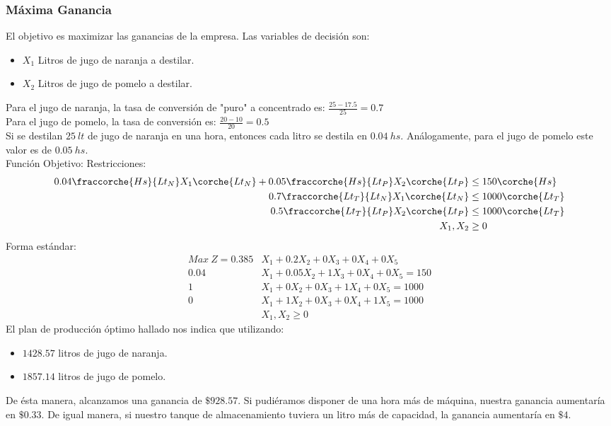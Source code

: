 \begin{homeworkProblem}[-1][Citrus]
\subsubsection{Máxima Ganancia}
El objetivo es maximizar las ganancias de la empresa.
Las variables de decisión son:
\begin{itemize}
  \item $X_1$ Litros de jugo de naranja a destilar.
  \item $X_2$ Litros de jugo de pomelo a destilar.
\end{itemize}
Para el jugo de naranja, la tasa de conversión de "puro" a concentrado es: $\frac{25-17.5}{25} = 0.7$ \\
Para el jugo de pomelo, la tasa de conversión es: $ \frac{20-10}{20} = 0.5$ \\
Si se destilan $25\ lt$ de jugo de naranja en una hora, entonces cada litro se destila en $0.04\ hs$. Análogamente, para el jugo de pomelo este valor es de $0.05\ hs$. \\
Función Objetivo: 
Restricciones:
\begin{align*}
  0.04\fraccorche{Hs}{Lt_N}X_1\corche{Lt_N} + 0.05\fraccorche{Hs}{Lt_P}X_2\corche{Lt_P} &\le 150\corche{Hs} \\
  0.7\fraccorche{Lt_T}{Lt_N}X_1\corche{Lt_N}                                            &\le 1000\corche{Lt_T} \\
  0.5\fraccorche{Lt_T}{Lt_P}X_2\corche{Lt_P}                                            &\le 1000\corche{Lt_T} \\
  X_1,X_2 &\ge 0 
\end{align*}
Forma estándar:
\begin{align*}
    Max\ Z = 0.385&X_1 + 0.2X_2 + 0X_3 + 0X_4 + 0X_5 \\
    0.04&X_1 + 0.05X_2 + 1X_3 + 0X_4 + 0X_5 = 150 \\
    1&X_1 + 0X_2 + 0X_3 + 1X_4 + 0X_5 = 1000 \\
    0&X_1 + 1X_2 + 0X_3 + 0X_4 + 1X_5 = 1000 \\
    &X_1,X_2 \ge 0
\end{align*}
El plan de producción óptimo hallado nos indica que utilizando: 
\begin{itemize}
  \item $1428.57$ litros de jugo de naranja.
  \item $1857.14$ litros de jugo de pomelo.
\end{itemize}
De ésta manera, alcanzamos una ganancia de $\$928.57$. Si pudiéramos disponer de una hora más de máquina, nuestra ganancia aumentaría en $\$0.33$. De igual manera, si nuestro tanque de almacenamiento tuviera un litro más de capacidad, la ganancia aumentaría en $\$4$.


\end{homeworkProblem}
